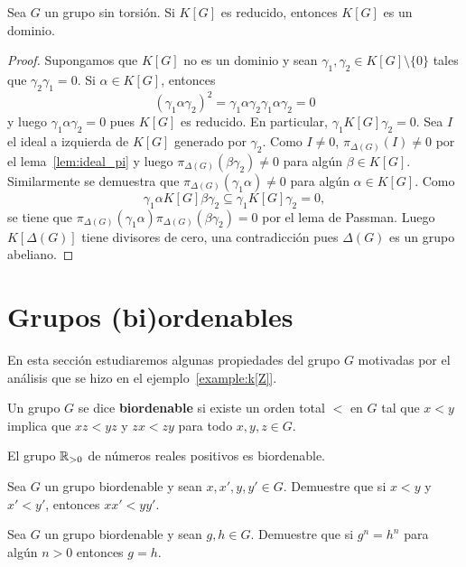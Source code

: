 \begin{theorem}
	Sea $G$ un grupo sin torsión. Si $K[G]$ es reducido, entonces $K[G]$ es un
	dominio.	
\end{theorem}

\begin{proof}
	Supongamos que $K[G]$ no es un dominio y sean $\gamma_1,\gamma_2\in K[G]\setminus\{0\}$
	tales que $\gamma_2\gamma_1=0$. Si $\alpha\in K[G]$, entonces
	\[
		(\gamma_1\alpha\gamma_2)^2=\gamma_1\alpha\gamma_2\gamma_1\alpha\gamma_2=0
	\]
	y luego $\gamma_1\alpha\gamma_2=0$ pues $K[G]$ es reducido. En particular,
	$\gamma_1K[G]\gamma_2=0$. Sea $I$ el ideal a izquierda de $K[G]$ generado
	por $\gamma_2$. Como $I\ne 0$, $\pi_{\Delta(G)}(I)\ne 0$ por el lema~\ref{lem:ideal_pi}
	y luego $\pi_{\Delta(G)}(\beta\gamma_2)\ne 0$ para algún $\beta\in K[G]$. Similarmente se demuestra que
	$\pi_{\Delta(G)}(\gamma_1\alpha)\ne 0$ para algún $\alpha\in K[G]$. Como
	\[
		\gamma_1\alpha K[G]\beta\gamma_2\subseteq \gamma_1 K[G]\gamma_2=0,
	\]
	se tiene que $\pi_{\Delta(G)}(\gamma_1\alpha)\pi_{\Delta(G)}(\beta\gamma_2)=0$ por
	el lema de Passman. Luego $K[\Delta(G)]$ tiene divisores de cero, una contradicción 
	pues $\Delta(G)$ es un grupo abeliano.
\end{proof}

\section{Grupos (bi)ordenables}

En esta sección estudiaremos algunas propiedades del grupo $G$ motivadas por el
análisis que se hizo en el ejemplo~\ref{example:k[Z]}.

\begin{definition}
	Un grupo $G$ se dice \textbf{biordenable} si existe un orden total $<$ en $G$
	tal que $x<y$ implica que $xz<yz$ y $zx<zy$ para todo $x,y,z\in G$.
\end{definition}

\begin{example}
	El grupo $\mathbb{R}_{>0}$ de números reales positivos es biordenable.
\end{example}

\begin{exercise}
	Sea $G$ un grupo biordenable y sean $x,x',y,y'\in G$. Demuestre que si
	$x<y$ y $x'<y'$, entonces $xx'<yy'$.
\end{exercise}

\begin{exercise}
	Sea $G$ un grupo biordenable y sean $g,h\in G$. Demuestre que si $g^n=h^n$
	para algún $n>0$ entonces $g=h$.
\end{exercise}

